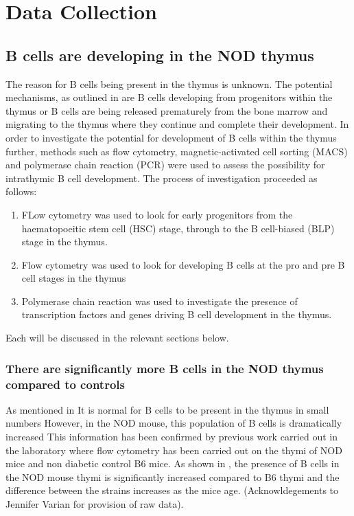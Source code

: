 
\chapter{Data Collection}




\section{B cells are developing in the NOD thymus}
The reason for B cells being present in the thymus is unknown. 
The potential mechanisms, as outlined in  are B cells developing from progenitors within the thymus or B cells are being released prematurely from the bone marrow and migrating to the thymus where they continue and complete their development.
In order to investigate the potential for development of B cells within the thymus further, methods such as flow cytometry, magnetic-activated cell sorting (MACS) and polymerase chain reaction (PCR) were used to assess the possibility for intrathymic B cell development.
The process of investigation proceeded as follows:
\begin{enumerate}
\item FLow cytometry was used to look for early progenitors from the haematopoeitic stem cell (HSC) stage, through to the B cell-biased (BLP) stage in the thymus. 
\item Flow cytometry was used to look for developing B cells at the pro and pre B cell stages in the thymus 
\item Polymerase chain reaction was used to investigate the presence of transcription factors and genes driving B cell development in the  thymus. 
\end{enumerate}

Each will be discussed in the relevant sections below.

\subsection{There are significantly more B cells in the NOD thymus compared to controls}
As mentioned in 
It is normal for B cells to be present in the thymus in small numbers %
However, in the NOD mouse, this population of B cells is dramatically increased %
This information has been confirmed by previous work carried out in the laboratory where flow cytometry has been carried out on the thymi of NOD mice and non diabetic control B6 mice.
As shown in , the presence of B cells in the NOD mouse thymi is significantly increased compared to B6 thymi and the difference between the strains increases as the mice age. (Acknowldegements to Jennifer Varian for provision of raw data). 

